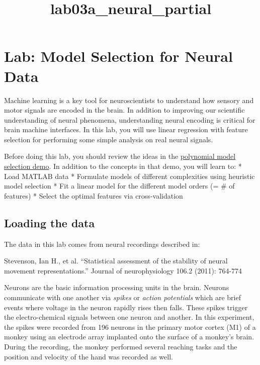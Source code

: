 \documentclass[11pt]{article}
\title{lab03a\_neural\_partial}
\begin{document}
    
    
    \maketitle
    
    

    
    \hypertarget{lab-model-selection-for-neural-data}{%
\section{Lab: Model Selection for Neural
Data}\label{lab-model-selection-for-neural-data}}

Machine learning is a key tool for neuroscientists to understand how
sensory and motor signals are encoded in the brain. In addition to
improving our scientific understanding of neural phenomena,
understanding neural encoding is critical for brain machine interfaces.
In this lab, you will use linear regression with feature selection for
performing some simple analysis on real neural signals.

Before doing this lab, you should review the ideas in the
\href{./polyfit.ipynb}{polynomial model selection demo}. In addition to
the concepts in that demo, you will learn to: * Load MATLAB data *
Formulate models of different complexities using heuristic model
selection * Fit a linear model for the different model orders (= \# of
features) * Select the optimal features via cross-validation

    \hypertarget{loading-the-data}{%
\subsection{Loading the data}\label{loading-the-data}}

The data in this lab comes from neural recordings described in:

 Stevenson, Ian H., et al. ``Statistical assessment of the stability of
neural movement representations.'' Journal of neurophysiology 106.2
(2011): 764-774

Neurons are the basic information processing units in the brain. Neurons
communicate with one another via \emph{spikes} or \emph{action
potentials} which are brief events where voltage in the neuron rapidly
rises then falls. These spikes trigger the electro-chemical signals
between one neuron and another. In this experiment, the spikes were
recorded from 196 neurons in the primary motor cortex (M1) of a monkey
using an electrode array implanted onto the surface of a monkey's brain.
During the recording, the monkey performed several reaching tasks and
the position and velocity of the hand was recorded as well.
\end{document}
